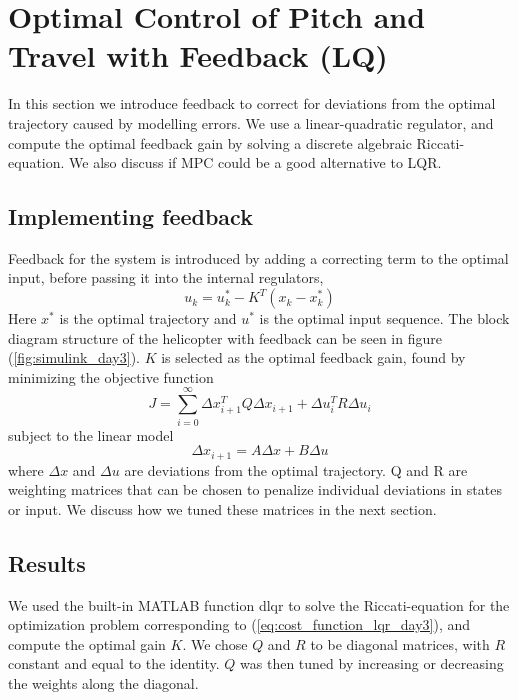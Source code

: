 \section{Optimal Control of Pitch and Travel with Feedback (LQ)}\label{sec:prob3}
In this section we introduce feedback to correct for deviations from the optimal trajectory caused by modelling errors. We use a linear-quadratic regulator, and compute the optimal feedback gain by solving a discrete algebraic Riccati-equation. We also discuss if MPC could be a good alternative to LQR.

\subsection{Implementing feedback}
Feedback for the system is introduced by adding a correcting term to the optimal input, before passing it into the internal regulators,
\begin{equation}
    u_k = u_k^* - K^T(x_k - x_k^*)
\end{equation}
Here $x^*$ is the optimal trajectory and $u^*$ is the optimal input sequence. The block diagram structure of the helicopter with feedback can be seen in figure (\ref{fig:simulink_day3}). $K$ is selected as the optimal feedback gain, found by minimizing the objective function
\begin{equation}
    \label{eq:cost_function_lqr_day3}
    J = \sum_{i=0}^\infty {\Delta x_{i+1}^TQ\Delta x_{i+1} + \Delta u_{i}^TR\Delta u_{i}}
\end{equation}
subject to the linear model
\begin{equation}
    \Delta x_{i+1} = A\Delta x + B\Delta u
\end{equation}
where $\Delta x$ and $\Delta u$ are deviations from the optimal trajectory. Q and R are weighting matrices that can be chosen to penalize individual deviations in states or input. We discuss how we tuned these matrices in the next section.

\subsection{Results}

We used the built-in MATLAB function dlqr to solve the Riccati-equation for the optimization problem corresponding to (\ref{eq:cost_function_lqr_day3}), and compute the optimal gain $K$. We chose $Q$ and $R$ to be diagonal matrices, with $R$ constant and equal to the identity. $Q$ was then tuned by increasing or decreasing the weights along the diagonal.

